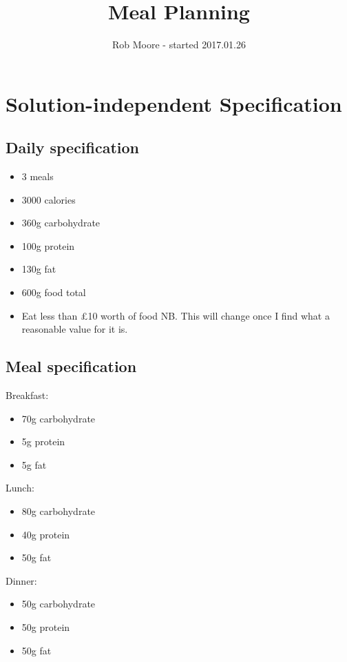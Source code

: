 \documentclass[a4paper]{article}
\title{Meal Planning}
\author{Rob Moore - started 2017.01.26}
\begin{document}
\maketitle

\section{Solution-independent Specification}

\subsection{Daily specification}

\begin{itemize}
  \item 3 meals
  \item 3000 calories
  \item 360g carbohydrate
  \item 100g protein
  \item 130g fat
  \item 600g food total
  \item Eat less than £10 worth of food NB. This will change once I find what a reasonable value for it is.
\end{itemize}

\subsection{Meal specification}

Breakfast:
\begin{itemize}
  \item 70g carbohydrate
  \item 5g protein
  \item 5g fat
\end{itemize}

Lunch:
\begin{itemize}
  \item 80g carbohydrate
  \item 40g protein
  \item 50g fat
\end{itemize}

Dinner:
\begin{itemize}
  \item 50g carbohydrate
  \item 50g protein
  \item 50g fat
\end{itemize}
\end{document}
